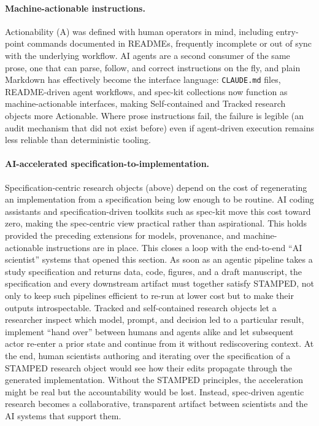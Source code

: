 \documentclass{article}
\begin{document}
\paragraph{Machine-actionable instructions.}
Actionability (A) was defined with human operators in mind, including entry-point commands documented in READMEs, frequently incomplete or out of sync with the underlying workflow.
AI agents are a second consumer of the same prose, one that can parse, follow, and correct instructions on the fly, and plain Markdown has effectively become the interface language: \texttt{CLAUDE.md} files, README-driven agent workflows, and spec-kit\cite{github_spec_2025} collections now function as machine-actionable interfaces, making Self-contained and Tracked research objects more Actionable.
Where prose instructions fail, the failure is legible (an audit mechanism that did not exist before) even if agent-driven execution remains less reliable than deterministic tooling.

\paragraph{AI-accelerated specification-to-implementation.}
Specification-centric research objects (above) depend on the cost of regenerating an implementation from a specification being low enough to be routine.
AI coding assistants and specification-driven toolkits such as spec-kit move this cost toward zero, making the spec-centric view practical rather than aspirational.
This holds provided the preceding extensions for models, provenance, and machine-actionable instructions are in place.
This closes a loop with the end-to-end ``AI scientist'' systems that opened this section\cite{boiko_autonomous_2023, lu_ai_2024, mitchener_kosmos_2025}.
As soon as an agentic pipeline takes a study specification and returns data, code, figures, and a draft manuscript, the specification and every downstream artifact must together satisfy STAMPED, not only to keep such pipelines efficient to re-run at lower cost but to make their outputs introspectable.
Tracked and self-contained research objects let a researcher inspect which model, prompt, and decision led to a particular result, implement ``hand over'' between humans and agents alike and let subsequent actor re-enter a prior state and continue from it without rediscovering context.
At the end, human scientists authoring and iterating over the specification of a STAMPED research object would see how their edits propagate through the generated implementation.
Without the STAMPED principles, the acceleration might be real but the accountability would be lost.
Instead, spec-driven agentic research becomes a collaborative, transparent artifact between scientists and the AI systems that support them.
\end{document}
